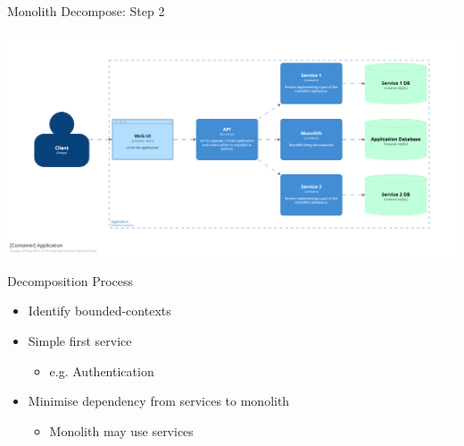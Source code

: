\documentclass{slide}
\begin{document}
\begin{frame}{Monolith Decompose: Step 2}
    \begin{adjustwidth}{-12mm}{-12mm}
        \centering
        \includegraphics[trim=195 195 195 195,clip,width=0.97\paperwidth]{diagrams/decompose3.png}
    \end{adjustwidth}
\end{frame}

\begin{frame}{Decomposition Process}
\vspace{1pt}
{\huge
\begin{itemize}
    \item Identify bounded-contexts
    \vspace{1mm}
    \item Simple first service
    \begin{itemize}
        \LARGE\item e.g. Authentication
    \end{itemize}
    \vspace{1mm}
    \item Minimise dependency from services to monolith
    \begin{itemize}
        \LARGE\item Monolith may use services
    \end{itemize}
\end{itemize}
}
\end{frame}
\end{document}
